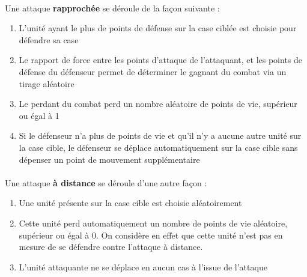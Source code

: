 \paragraph{}
Une attaque \textbf{rapprochée} se déroule de la façon suivante :

\begin{enumerate}
  \item L'unité ayant le plus de points de défense sur la case ciblée est choisie pour défendre sa case
  \item Le rapport de force entre les points d'attaque de l'attaquant, et les points de défense du défenseur permet de déterminer le gagnant du combat via un tirage aléatoire
  \item Le perdant du combat perd un nombre aléatoire de points de vie, supérieur ou égal à 1
  \item Si le défenseur n'a plus de points de vie et qu'il n'y a aucune autre unité sur la case cible, le défenseur se déplace automatiquement sur la case cible sans dépenser un point de mouvement supplémentaire
\end{enumerate}

\paragraph{}
Une attaque \textbf{à distance} se déroule d'une autre façon :

\begin{enumerate}
  \item Une unité présente sur la case cible est choisie aléatoirement
  \item Cette unité perd automatiquement un nombre de points de vie aléatoire, supérieur ou égal à 0. On considère en effet que cette unité n'est pas en mesure de se défendre contre l'attaque à distance.
  \item L'unité attaquante ne se déplace en aucun cas à l'issue de l'attaque
\end{enumerate}
